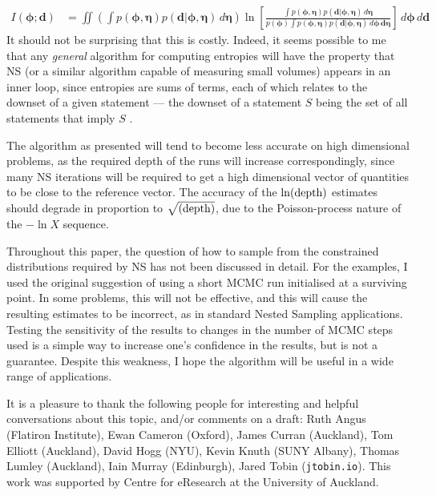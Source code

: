 \documentclass[entropy,article,accept,oneauthor,pdftex,10pt,a4paper]{mdpi}
\renewcommand{\d}{\boldsymbol{d}}
\newcommand{\bphi}{\boldsymbol{\phi}}
\newcommand{\boldeta}{\boldsymbol{\eta}}
\newcommand{\depth}{(\textnormal{depth})}
\begin{document}
\begin{align}
I(\bphi; \d) &= \iint
  \left(\int p(\bphi, \boldeta)p(\d | \bphi, \boldeta) \, d\boldeta\right)
                        \ln \left[
  \frac{\int p(\bphi, \boldeta)p(\d | \bphi, \boldeta) \, d\boldeta}
{p(\bphi)\int p(\bphi, \boldeta)p(\d | \bphi, \boldeta) \, d\bphi \, \d\boldeta}\right]
                        \, d\bphi \, d\d
\end{align}
It should not be surprising that this is costly. Indeed, it seems possible
to me that any {\em general} algorithm for computing entropies will have the
property that NS (or a similar algorithm capable of measuring small volumes)
appears in an inner loop, since entropies are sums of terms, each of which
relates to the downset of a given statement --- the downset of a statement
$S$ being the set of all statements that imply $S$ \citep{knuth_questions}.

The algorithm as presented will tend to become less accurate on high dimensional
problems, as the required depth of the runs will increase correspondingly,
since many NS iterations will be required to get a high dimensional vector
of quantities to be close to the reference vector.
The accuracy of the $\ln\depth$ estimates should degrade in proportion to
$\sqrt{\depth}$, due to the Poisson-process nature of the $-\ln X$ sequence.

Throughout this paper, the question of how to sample from the constrained
distributions required by NS has not been discussed in detail. For the examples,
I used the original \citet{skilling2006nested} suggestion of using a short MCMC run
initialised at a surviving point. In some problems, this will not be effective,
and this will cause the resulting estimates to be incorrect, as in standard
Nested Sampling applications. Testing the sensitivity of the results to
changes in the number of MCMC steps used is a simple way to increase one's
confidence in the results, but is not a guarantee.
Despite this weakness, I hope the algorithm will be
useful in a wide range of applications.

It is a pleasure to thank the following people for interesting and helpful
conversations about this topic, and/or comments on a draft:
Ruth Angus (Flatiron Institute),
Ewan Cameron (Oxford), James Curran (Auckland), Tom Elliott (Auckland),
David Hogg (NYU), Kevin Knuth (SUNY Albany),
Thomas Lumley (Auckland),
Iain Murray (Edinburgh), Jared Tobin ({\tt jtobin.io}).
This work was supported by Centre for eResearch
at the University of Auckland.
\end{document}
